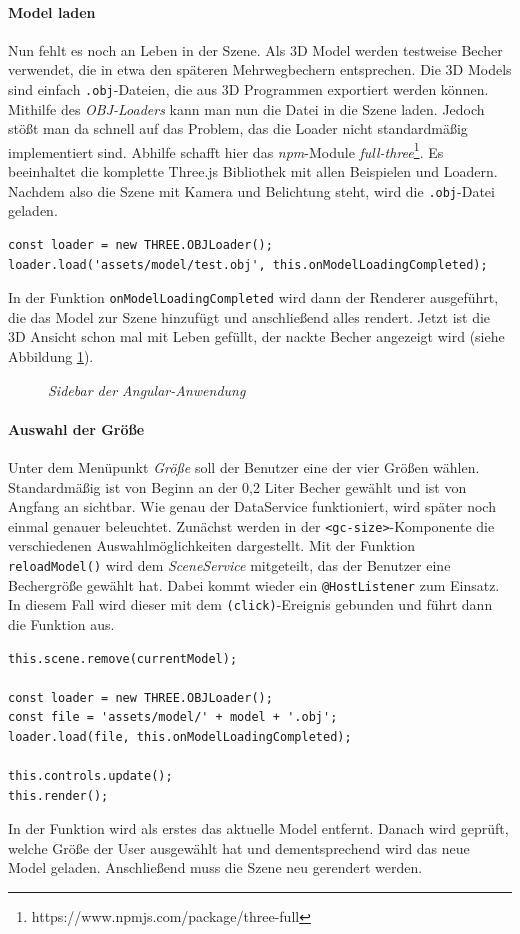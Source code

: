 \paragraph{Model laden} Nun fehlt es noch an Leben in der Szene. Als 3D Model werden testweise Becher verwendet, die in etwa den späteren Mehrwegbechern entsprechen. Die 3D Models sind einfach \texttt{.obj}-Dateien, die aus 3D Programmen exportiert werden können. Mithilfe des \textit{OBJ-Loaders} kann man nun die Datei in die Szene laden. Jedoch stößt man da schnell auf das Problem, das die Loader nicht standardmäßig implementiert sind. Abhilfe schafft hier das \textit{npm}-Module \textit{full-three}\footnote{https://www.npmjs.com/package/three-full}. Es beeinhaltet die komplette Three.js Bibliothek mit allen Beispielen und Loadern. Nachdem also die Szene mit Kamera und Belichtung steht, wird die \texttt{.obj}-Datei geladen.
%
\begin{lstlisting}[caption={Laden des Models mit dem OBJLoader},label=lst:objloader]
const loader = new THREE.OBJLoader();
loader.load('assets/model/test.obj', this.onModelLoadingCompleted);
\end{lstlisting}
%
In der Funktion \texttt{onModelLoadingCompleted} wird dann der Renderer ausgeführt, die das Model zur Szene hinzufügt und anschließend alles rendert. Jetzt ist die 3D Ansicht schon mal mit Leben gefüllt, der nackte Becher angezeigt wird (siehe Abbildung \ref{fig:3dmodel}).
\begin{figure}[h]
	\centering
	{}
	\caption[Komponentendiagramm]{\textit{Sidebar der Angular-Anwendung}}
	\label{fig:3dmodel}
\end{figure}
\paragraph{Auswahl der Größe}
Unter dem Menüpunkt \textit{\glqq Größe\grqq} soll der Benutzer eine der vier Größen wählen. Standardmäßig ist von Beginn an der 0,2 Liter Becher gewählt und ist von Angfang an sichtbar. Wie genau der DataService funktioniert, wird später noch einmal genauer beleuchtet. Zunächst werden in der \texttt{<gc-size>}-Komponente die verschiedenen Auswahlmöglichkeiten dargestellt. Mit der Funktion \texttt{reloadModel()} wird dem \textit{SceneService} mitgeteilt, das der Benutzer eine Bechergröße gewählt hat. Dabei kommt wieder ein \texttt{@HostListener} zum Einsatz. In diesem Fall wird dieser mit dem \texttt{(click)}-Ereignis gebunden und führt dann die Funktion aus.
%
\begin{lstlisting}[caption={Ausschnitt der reloadModel()-Funktion},label=lst:reloadmodel]
this.scene.remove(currentModel);

const loader = new THREE.OBJLoader();
const file = 'assets/model/' + model + '.obj';
loader.load(file, this.onModelLoadingCompleted);

this.controls.update();
this.render();
\end{lstlisting}
%
In der Funktion wird als erstes das aktuelle Model entfernt. Danach wird geprüft, welche Größe der User ausgewählt hat und dementsprechend wird das neue Model geladen. Anschließend muss die Szene neu gerendert werden. 
